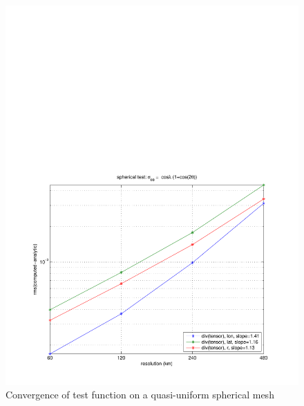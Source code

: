 \documentclass[11pt]{report}
\begin{document}
\begin{figure}[htbp]
 \center
 \includegraphics[scale=0.8, trim = 0 0 0 4in, clip]{f/a19_sph_conv_test_4.pdf}
 \caption{Convergence of test function on a quasi-uniform spherical mesh}
 \label{fig:convergence4}
\end{figure}






\end{document}
